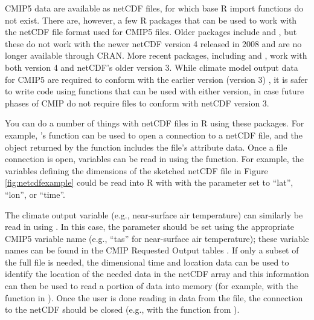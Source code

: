 CMIP5 data are available as netCDF files, for which base R import
functions do not exist. There are, however, a few R packages that can be
used to work with the netCDF file format used for CMIP5 files. Older
packages include  and , but these do not work with
the newer netCDF version 4 released in 2008 and are no longer available
through CRAN. More recent packages, including 
\citep{CRANncdf4} and 
\citep{michna2013rnetcdf, RNetCDF}, work with both version 4 and
netCDF's older version 3. While climate model output data for CMIP5 are
required to conform with the earlier version (version 3)
\citep{taylor2010cmip5}, it is safer to write code using functions that
can be used with either version, in case future phases of CMIP do not
require files to conform with netCDF version 3.

You can do a number of things with netCDF files in R using these
packages. For example, 's  function can be
used to open a connection to a netCDF file, and the object returned by
the function includes the file's attribute data. Once a file connection
is open, variables can be read in using the  function.
For example, the variables defining the dimensions of the sketched
netCDF file in Figure \ref{fig:netcdfexample} could be read into R with
 with the  parameter set to ``lat'',
``lon'', or ``time''.

The climate output variable (e.g., near-surface air temperature) can
similarly be read in using . In this case, the
 parameter should be set using the appropriate CMIP5
variable name (e.g., ``tas'' for near-surface air temperature); these
variable names can be found in the CMIP Requested Output tables
\citep{taylor2010cmip5}. If only a subset of the full file is needed,
the dimensional time and location data can be used to identify the
location of the needed data in the netCDF array and this information can
then be used to read a portion of data into memory (for example, with
the  function in
). Once the user is done reading in data from the
file, the connection to the netCDF should be closed (e.g., with the
 function from ).

